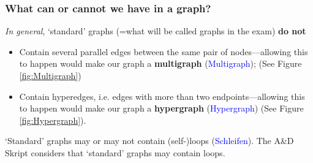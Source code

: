 \documentclass[a4paper]{article}
\begin{document}
\subsubsection{What can or cannot we have in a graph?}

\emph{In general}, `standard' graphs (=what will be called graphs in the exam) \textbf{do not}
\begin{itemize}
\item Contain several parallel edges between the same pair of nodes---allowing this to happen would make our graph a \textbf{multigraph} (\textcolor{blue}{{Multigraph}}); (See Figure \ref{fig:Multigraph})
\item Contain hyperedges, i.e. edges with more than two endpoints---allowing this to happen would make our graph a \textbf{hypergraph} (\textcolor{blue}{{Hypergraph}}) (See Figure \ref{fig:Hypergraph}).
\end{itemize}
`Standard' graphs may or may not contain (self-)loops (\textcolor{blue}{{Schleifen}}). The A\&D Skript considers that `standard' graphs may contain loops.
\end{document}
